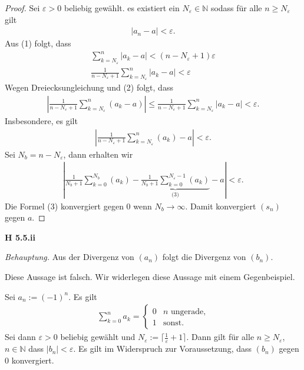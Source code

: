 \documentclass[12pt]{extarticle}
\begin{document}
\begin{proof}
  Sei \(\varepsilon > 0\) beliebig gewählt.  es existiert ein $N_{\varepsilon} \in
  \mathbb{N}$ sodass für alle \(n \geq N_{\varepsilon}\) gilt
\begin{align*}
\left| a_n-a \right|<\varepsilon. \tag{1}
\end{align*}
Aus (1) folgt, dass
\begin{align*}
  \sum_{k=N_{\varepsilon}}^n{\left| a_k - a \right|}
  < \left( n - N_{\varepsilon} + 1 \right)\varepsilon\\
  \frac{1}{n - N_{\varepsilon} + 1}\sum_{k=N_{\varepsilon}}^n
  {\left| a_k - a \right|}  < \varepsilon \tag{2}
\end{align*}
Wegen Dreiecksungleichung und (2) folgt, dass
\begin{align*}
\left| \frac{1}{n-N_{\varepsilon}+1}
  \sum_{k=N_{\varepsilon}}^n{(a_k-a)} \right|
  \leq \frac{1}{n-N_{\varepsilon}+1}\sum_{k=N_{\varepsilon}}^n{\left|
  a_k - a \right|} < \varepsilon.
\end{align*}
Insbesondere, es gilt
\begin{align*}
  \left| \frac{1}{n-N_{\varepsilon}+1}
  \sum_{k=N_{\varepsilon}}^n{(a_k)} - a \right|  < \varepsilon.
\end{align*}
Sei \(N_b = n-N_{\varepsilon}\), dann erhalten wir
\begin{align*}
  \left| \frac{1}{N_b+1}
  \sum_{k=0}^{N_b}{(a_k)} -
  \underbrace{\frac{1}{N_b+1}
  \sum_{k=0}^{N_{\varepsilon}-1}{(a_k)}}_{\text{(3)}}
  - a \right|  < \varepsilon.
\end{align*}
Die Formel (3) konvergiert gegen \(0\) wenn
\(N_b\rightarrow\infty\). Damit konvergiert \((s_n)\) gegen \(a\).
\end{proof}

\textbf{H 5.5.ii}

\textit{Behauptung.}  Aus der Divergenz von \((a_n)\) folgt die
Divergenz von \((b_n)\).

Diese Aussage ist falsch.  Wir widerlegen diese Aussage mit einem
Gegenbeispiel.

Sei \(a_n:=(-1)^n\).  Es gilt
\begin{align*}
  \sum_{k=0}^n{a_k}=\begin{cases}
                      0 & n \text{ ungerade,}\\
                      1 & \text{sonst.}
                    \end{cases}
\end{align*}
Sei dann \(\varepsilon > 0\) beliebig gewählt und
\(N_{\varepsilon} := \lceil \frac{1}{\varepsilon} + 1 \rceil\).  Dann
gilt für alle \(n \geq N_{\varepsilon}\), \(n \in \mathbb{N}\) dass
\(\left| b_n \right| < \varepsilon\). Es gilt im Widerspruch zur
Voraussetzung, dass \((b_n)\) gegen \(0\) konvergiert.
\end{document}
